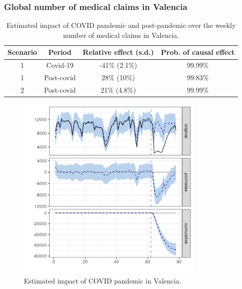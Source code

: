 \documentclass[9pt]{osa-supplemental-document}
\begin{document}
\subsubsection{Global number of medical claims in Valencia}\label{valencia}
\begin{table}[H]\caption{Estimated impact of COVID pandemic and post-pandemic over the weekly number of medical claims in Valencia.}
  \centering  
  \begin{tabular}{ |c|c|c|c| }
      \hline
   \textbf{Scenario} & \textbf{Period} & \textbf{Relative effect (s.d.)} & \textbf{Prob. of causal effect} \\ 
   \hline
   1 & Covid-19 & -41\% (2.1\%) & 99.99\% \\  
   1 & Post-covid & 28\% (10\%) &  99.83\% \\
   \hline   
   2 & Post-covid & 21\% (4.8\%) & 99.99\% \\
   \hline
  \end{tabular}
\end{table}

\begin{center}
  \begin{figure}[H]
    \includegraphics[width=9cm]{global_covid_Valencia.png}\caption{Estimated impact of COVID pandemic in Valencia.}
  \end{figure}
  \end{center}
  
\end{document}
